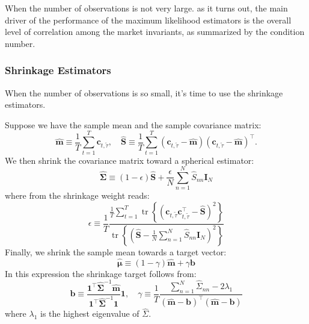 \documentclass[13pt]{article}
\theoremstyle{definition}
\theoremstyle{remark}
\newenvironment{remark}
  {\pushQED{\qed}\renewcommand{\qedsymbol}{$\triangle$}\remarkx}
  {\popQED\endremarkx}
\begin{document}
\begin{remark}
    When the number of observations is not very large. as it turns out, the main driver of the performance of the maximum likelihood estimators is the overall level of correlation among the market invariants, as summarized by the condition number.
\end{remark}

\subsubsection{Shrinkage Estimators}{\color{C6}When the number of observations is so small, it's time to use the shrinkage estimators.}

Suppose we have the sample mean and the sample covariance matrix:
$$
\widehat{\mathbf{m}} \equiv \frac{1}{T} \sum_{t=1}^T \mathbf{c}_{t, \tilde{\tau}}, \quad \widehat{\mathbf{S}} \equiv \frac{1}{T} \sum_{t=1}^T\left(\mathbf{c}_{t, \tilde{\tau}}-\widehat{\mathbf{m}}\right)\left(\mathbf{c}_{t, \tilde{\tau}}-\widehat{\mathbf{m}}\right)^{\top} .
$$
 We then shrink the covariance matrix toward a spherical estimator:
$$
\widehat{\mathbf{\Sigma}} \equiv(1-\epsilon) \widehat{\mathbf{S}}+\frac{\epsilon}{N} \sum_{n=1}^N \widehat{S}_{n n} \mathbf{I}_N
$$
where from  the shrinkage weight reads:
$$
\epsilon \equiv \frac{1}{T} \frac{\frac{1}{T} \sum_{t=1}^T \operatorname{tr}\left\{\left(\mathbf{c}_{t, \tilde{\tau}} \mathbf{c}_{t, \tilde{\tau}}^{\top}-\widehat{\mathbf{S}}\right)^2\right\}}{\operatorname{tr}\left\{\left(\widehat{\mathbf{S}}-\frac{1}{N} \sum_{n=1}^N \widehat{S}_{n n} \mathbf{I}_N\right)^2\right\}}
$$
Finally, we shrink the sample mean towards a target vector:
$$
\widehat{\boldsymbol{\mu}} \equiv(1-\gamma) \widehat{\mathbf{m}}+\gamma \mathbf{b}
$$
In this expression the shrinkage target follows from:
$$
\mathbf{b} \equiv \frac{\mathbf{1}^{\top} \widehat{\mathbf{\Sigma}}^{-1} \widehat{\mathbf{m}}}{\mathbf{1}^{\top} \widehat{\mathbf{\Sigma}}^{-1} \mathbf{1}} \mathbf{1}, \quad \gamma \equiv \frac{1}{T} \frac{\sum_{n=1}^N \widehat{\Sigma}_{n n}-2 \lambda_1}{(\widehat{\mathbf{m}}-\mathbf{b})^{\top}(\widehat{\mathbf{m}}-\mathbf{b})}
$$
where $\lambda_1$ is the highest eigenvalue of $\widehat{\Sigma}$.
\end{document}
